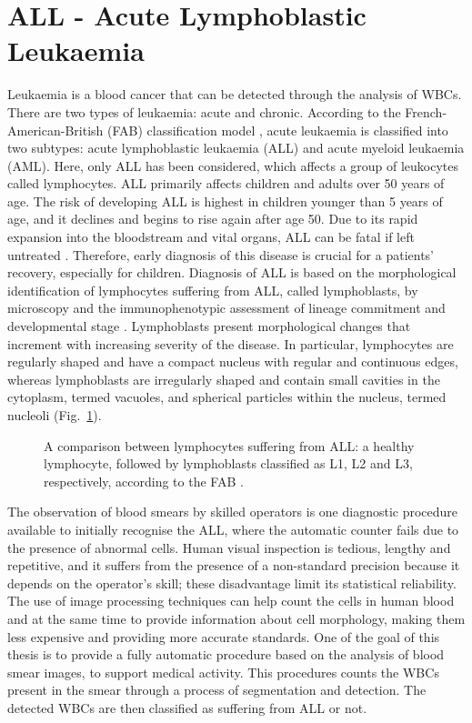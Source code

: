 \documentclass[final,a4paper,12pt,english]{UnicaPhdThesis3}
\begin{document}
	\section{ALL - Acute Lymphoblastic Leukaemia}
	Leukaemia is a blood cancer that can be detected through the analysis of WBCs. There are two types of leukaemia: acute and chronic. According to the French-American-British (FAB) classification model \cite{Bennett}, acute leukaemia is classified into two subtypes: acute lymphoblastic leukaemia (\acs{ALL}) and acute myeloid leukaemia (AML). Here, only ALL has been considered, which affects a group of leukocytes called lymphocytes. ALL primarily affects children and adults over 50 years of age. The risk of developing ALL is highest in children younger than 5 years of age, and it declines and begins to rise again after age 50. Due to its rapid expansion into the bloodstream and vital organs, ALL can be fatal if left untreated \cite{Biondi}. Therefore, early diagnosis of this disease is crucial for a patients' recovery, especially for children. Diagnosis of ALL is based on the morphological identification of lymphocytes suffering from ALL, called lymphoblasts, by microscopy and the immunophenotypic assessment of lineage commitment and developmental stage \cite{Inaba}. Lymphoblasts present morphological changes that increment with increasing severity of the disease. In particular, lymphocytes are regularly shaped and have a compact nucleus with regular and continuous edges, whereas lymphoblasts are irregularly shaped and contain small cavities in the cytoplasm, termed vacuoles, and spherical particles within the nucleus, termed nucleoli \cite{Donida} (Fig.~\ref{fig:ex2}).
	
	\begin{figure}[!t]
		\centering
		\caption{\label{fig:ex2}A comparison between lymphocytes suffering from ALL: a healthy lymphocyte, followed by lymphoblasts classified as L1, L2 and L3, respectively, according to the FAB \cite{Bennett}.}
	\end{figure}
	
	The observation of blood smears by skilled operators is one diagnostic procedure available to initially recognise the ALL, where the automatic counter fails due to the presence of abnormal cells. Human visual inspection is tedious, lengthy and repetitive, and it suffers from the presence of a non-standard precision because it depends on the operator's skill; these disadvantage limit its statistical reliability. The use of image processing techniques can help count the cells in human blood and at the same time to provide information about cell morphology, making them less expensive and providing more accurate standards. One of the goal of this thesis is to provide a fully automatic procedure based on the analysis of blood smear images, to support medical activity. This procedures counts the WBCs present in the smear through a process of segmentation and detection. The detected WBCs are then classified as suffering from ALL or not. 
	
\end{document}
